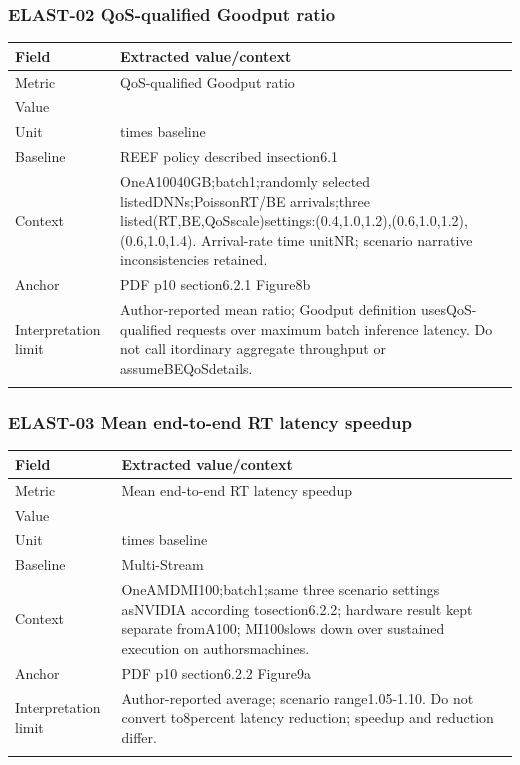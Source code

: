 \subsubsection*{ELAST-02 QoS-qualified Goodput ratio}
\begin{longtable}{>{\raggedright\arraybackslash}p{}>{\raggedright\arraybackslash}p{}}
\toprule
\textbf{Field} & \textbf{Extracted value/context}\\\midrule\endhead
Metric & QoS-qualified Goodput ratio\\\addlinespace
Value & 1.43\\\addlinespace
Unit & times baseline\\\addlinespace
Baseline & REEF policy described insection6.1\\\addlinespace
Context & OneA10040GB;\allowbreak{}batch1;\allowbreak{}randomly selected listedDNNs;\allowbreak{}PoissonRT/BE arrivals;\allowbreak{}three listed(RT,\allowbreak{}BE,\allowbreak{}QoSscale)settings:(0.4,\allowbreak{}1.0,\allowbreak{}1.2),\allowbreak{}(0.6,\allowbreak{}1.0,\allowbreak{}1.2),\allowbreak{}(0.6,\allowbreak{}1.0,\allowbreak{}1.4). Arrival-rate time unitNR;\allowbreak{} scenario narrative inconsistencies retained.\\\addlinespace
Anchor & PDF p10 section6.2.1 Figure8b\\\addlinespace
Interpretation limit & Author-reported mean ratio;\allowbreak{} Goodput definition usesQoS-qualified requests over maximum batch inference latency. Do not call itordinary aggregate throughput or assumeBEQoSdetails.\\\addlinespace
\bottomrule\end{longtable}
\subsubsection*{ELAST-03 Mean end-to-end RT latency speedup}
\begin{longtable}{>{\raggedright\arraybackslash}p{}>{\raggedright\arraybackslash}p{}}
\toprule
\textbf{Field} & \textbf{Extracted value/context}\\\midrule\endhead
Metric & Mean end-to-end RT latency speedup\\\addlinespace
Value & 1.08\\\addlinespace
Unit & times baseline\\\addlinespace
Baseline & Multi-Stream\\\addlinespace
Context & OneAMDMI100;\allowbreak{}batch1;\allowbreak{}same three scenario settings asNVIDIA according tosection6.2.2;\allowbreak{} hardware result kept separate fromA100;\allowbreak{} MI100slows down over sustained execution on authorsmachines.\\\addlinespace
Anchor & PDF p10 section6.2.2 Figure9a\\\addlinespace
Interpretation limit & Author-reported average;\allowbreak{} scenario range1.05-1.10. Do not convert to8percent latency reduction;\allowbreak{} speedup and reduction differ.\\\addlinespace
\bottomrule\end{longtable}
